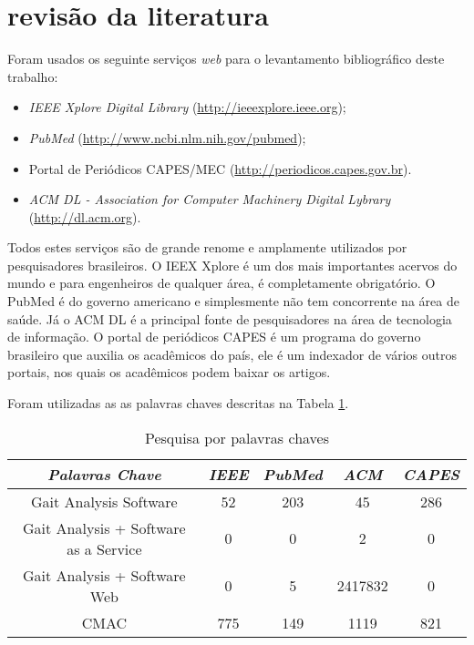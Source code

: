 \section[REVISÃO DA LITERATURA]{revisão da literatura}
Foram usados os seguinte serviços \emph{web} para o levantamento bibliográfico deste trabalho:
\begin{itemize}
	\item \emph{IEEE Xplore Digital Library} (\url{http://ieeexplore.ieee.org});
	\item \emph{PubMed} (\url{http://www.ncbi.nlm.nih.gov/pubmed});
	\item Portal de Periódicos CAPES/MEC (\url{http://periodicos.capes.gov.br}).
	\item \emph{ACM DL - Association for Computer Machinery Digital Lybrary} (\url{http://dl.acm.org}).
\end{itemize}

Todos estes serviços são de grande renome e amplamente utilizados por pesquisadores brasileiros. O IEEX Xplore é um dos mais importantes acervos do mundo e para engenheiros de qualquer área, é completamente obrigatório. O PubMed é do governo americano e simplesmente não tem concorrente na área de saúde. Já o ACM DL é a principal fonte de pesquisadores na área de tecnologia de informação. O portal de periódicos CAPES é um programa do governo brasileiro que auxilia os acadêmicos do país, ele é um indexador de vários outros portais, nos quais os acadêmicos podem baixar os artigos.

Foram utilizadas as as palavras chaves descritas na Tabela \ref{palavra_chave}.
\begin{table}[ht]
	\centering
	\caption{Pesquisa por palavras chaves}
	\label{palavra_chave}
	\ABNTEXfontereduzida
	\begin{tabular}{c c c c c}
		\toprule
		\textit{Palavras Chave} & \textit{IEEE} & \textit{PubMed} & \textit{ACM} & \textit{CAPES}\\
		\midrule
		\ABNTEXfontereduzida
		Gait Analysis Software  & 52 & 203 & 45 & 286\\
		Gait Analysis + Software as a Service & 0 & 0 & 2 & 0\\
		Gait Analysis + Software Web  & 0 & 5 & 2417832 & 0\\
		CMAC & 775 & 149 & 1119 & 821\\
		\bottomrule
	\end{tabular}
\end{table}



